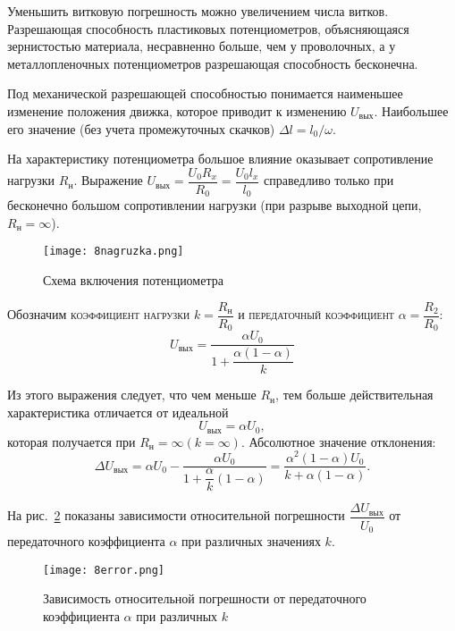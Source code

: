 Уменьшить витковую погрешность можно увеличением числа витков. Разрешающая способность пластиковых потенциометров, объясняющаяся зернистостью материала, несравненно больше, чем у проволочных, а у металлопленочных потенциометров разрешающая способность бесконечна.

Под механической разрешающей способностью понимается наименьшее изменение положения движка, которое приводит к изменению $ U_\text{вых} $. Наибольшее его значение (без учета промежуточных скачков) $ \Delta l = l_0/\omega $.

На характеристику потенциометра большое влияние оказывает сопротивление нагрузки $ R_\text{н} $. Выражение $ U_\text{вых} = \dfrac{U_0 R_x}{R_0} = \dfrac{U_0 l_x}{l_0} $ справедливо только при бесконечно большом сопротивлении нагрузки (при разрыве выходной цепи, $ R_\text{н} = \infty $). 

\begin{figure}[h!]
	\begin{center}
		\caption{ Схема включения потенциометра }
		\texttt{[image: 8nagruzka.png]}
		\label{pic:8nagruzka}
	\end{center}
\end{figure}

Обозначим \textsc{коэффициент нагрузки} $ k = \dfrac{R_\text{н}}{R_0} $ и \textsc{передаточный коэффициент} $ \alpha = \dfrac{R_2}{R_0} $:
\[ U_\text{вых} = \dfrac{\alpha U_0}{1+\dfrac{\alpha (1-\alpha)}{k}} \]

Из этого выражения следует, что чем меньше $ R_\text{н} $, тем больше действительная характеристика отличается от идеальной 
\[U_\text{вых} = \alpha U_0,\]
которая получается при $ R_\text{н} = \infty (k = \infty) $. Абсолютное значение отклонения:
\[ \Delta U_\text{вых} = \alpha U_0 - \dfrac{\alpha U_0}{1 + \dfrac{\alpha}{k}(1-\alpha)} = \dfrac{\alpha^2 (1-\alpha) U_0}{k+\alpha(1-\alpha)}.\]

На рис.~\ref{pic:8error} показаны зависимости относительной погрешности $ \dfrac{\Delta U_\text{вых}}{U_0} $ от передаточного коэффициента $ \alpha $ при различных значениях $ k $.

\begin{figure}[h!]
	\begin{center}
		\texttt{[image: 8error.png]}
		\label{pic:8error}
		\caption{ Зависимость относительной погрешности от передаточного коэффициента $ \alpha $ при различных $ k $}
	\end{center}
\end{figure}

